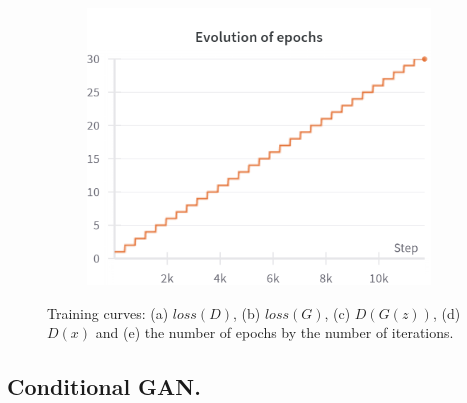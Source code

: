 \begin{figure}[H]
    \begin{subfigure}{0.45\textwidth}
        \centering
        \includegraphics[width=0.95\linewidth]{cifar10/64_nz100/epochs.png}
        \caption{}
        \label{subfig:cifar10/64_nz100/epochs}
    \end{subfigure}%

    \caption{Training curves: (a) $loss(D)$, (b) $loss(G)$, (c) $D(G(z))$, (d) $D(x)$ and (e) the number of epochs by the number of iterations.}
    \label{fig:cifar10_64_nz100_curves}
\end{figure}

\subsection{Conditional GAN.} \label{appendix:cDCGAN}


